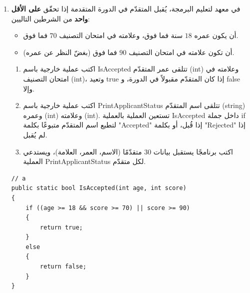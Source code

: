 \documentclass[14pt]{extarticle}
\begin{document}
\begin{enumerate}[resume, itemsep=2em]
\filbreak

\begin{boxSolution}
\begin{english}
\begin{verbatim}
// c
public static void Main()
{
    double totalRevenue = 0;
    for (int i = 0; i < 10; i++)
    {
        double price = double.Parse(Console.ReadLine());
        double weight = double.Parse(Console.ReadLine());
        double orderTotal = TotalOrderPrice(price, weight);
        Console.WriteLine(orderTotal);
        totalRevenue += orderTotal;
    }
    Console.WriteLine("Total revenue: " + totalRevenue);
}
\end{verbatim}
\end{english}
\end{boxSolution}
\fi
\filbreak

\item
في معهد لتعليم البرمجة، يُقبل المتقدّم في الدورة المتقدمة إذا تحقّق \textbf{على الأقل واحد} من الشرطين التاليين:
\begin{itemize}[nosep]
    \item أن يكون عمره $18$ سنة فما فوق، وعلامته في امتحان التصنيف $70$ فما فوق.
    \item أن تكون علامته في امتحان التصنيف $90$ فما فوق (بغضّ النظر عن عمره).
\end{itemize}
\begin{enumerate}
    \item اكتب عملية خارجية باسم \textenglish{IsAccepted} تتلقى عمر المتقدّم (\textenglish{int}) وعلامته في امتحان التصنيف (\textenglish{int})، وتعيد \textenglish{true} إذا كان المتقدّم مقبولاً في الدورة، و \textenglish{false} وإلا.
    \item اكتب عملية خارجية باسم \textenglish{PrintApplicantStatus} تتلقى اسم المتقدّم (\textenglish{string}) وعمره (\textenglish{int}) وعلامته (\textenglish{int}). تستعين العملية بالعملية \textenglish{IsAccepted} داخل جملة \textenglish{if} لتطبع اسم المتقدّم متبوعًا بكلمة \textenglish{"Accepted"} إذا قُبل، أو بكلمة \textenglish{"Rejected"} إذا لم يُقبل.
    \item اكتب برنامجًا يستقبل بيانات $30$ متقدّمًا (الاسم، العمر، العلامة)، ويستدعي العملية \textenglish{PrintApplicantStatus} لكل متقدّم.
\end{enumerate}
\ifwithsols
\begin{boxSolution}
\begin{english}
\begin{verbatim}
// a
public static bool IsAccepted(int age, int score)
{
    if ((age >= 18 && score >= 70) || score >= 90)
    {
        return true;
    }
    else
    {
        return false;
    }
}


\end{verbatim}
\end{english}
\end{boxSolution}
\end{enumerate}
\end{document}
